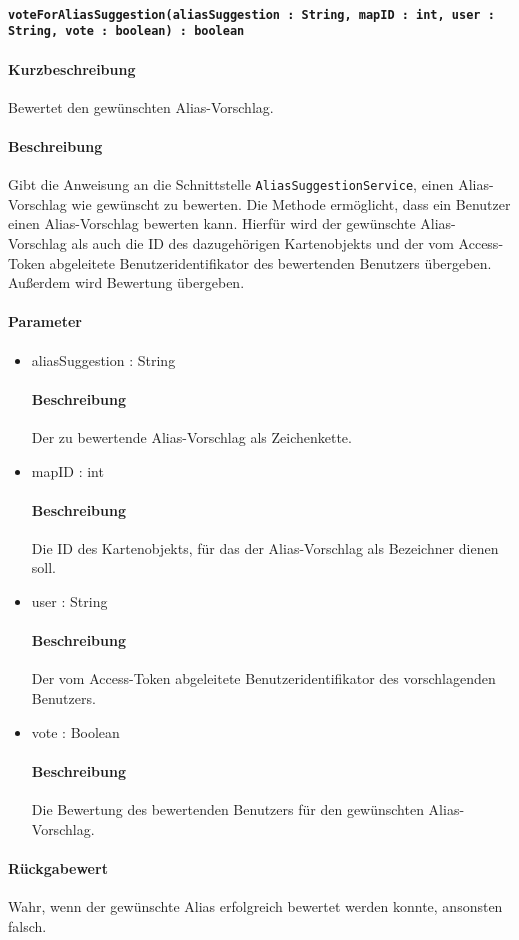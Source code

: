 \paragraph*{\texttt{voteForAliasSuggestion(aliasSuggestion : String, mapID : int, user : String, vote : boolean) : boolean}}%
\paragraph*{Kurzbeschreibung}
Bewertet den gewünschten Alias-Vorschlag.
\paragraph*{Beschreibung}
Gibt die Anweisung an die Schnittstelle \texttt{AliasSuggestionService}, einen Alias-Vorschlag wie gewünscht zu bewerten.
Die Methode ermöglicht, dass ein Benutzer einen Alias-Vorschlag bewerten kann. 
Hierfür wird der gewünschte Alias-Vorschlag als auch die ID des dazugehörigen Kartenobjekts und der vom Access-Token abgeleitete Benutzeridentifikator des bewertenden Benutzers übergeben.
Außerdem wird Bewertung übergeben.
\paragraph*{Parameter}
\begin{itemize}
	\item aliasSuggestion : String
		\paragraph*{Beschreibung}
		Der zu bewertende Alias-Vorschlag als Zeichenkette.
	\item mapID : int
		\paragraph*{Beschreibung}
		Die ID des Kartenobjekts, für das der Alias-Vorschlag als Bezeichner dienen soll.
	\item user : String
		\paragraph*{Beschreibung}
		Der vom Access-Token abgeleitete Benutzeridentifikator des vorschlagenden Benutzers.
	\item vote : Boolean
		\paragraph*{Beschreibung}
		Die Bewertung des bewertenden Benutzers für den gewünschten Alias-Vorschlag.
\end{itemize}
\paragraph*{Rückgabewert}
Wahr, wenn der gewünschte Alias erfolgreich bewertet werden konnte, ansonsten falsch.
